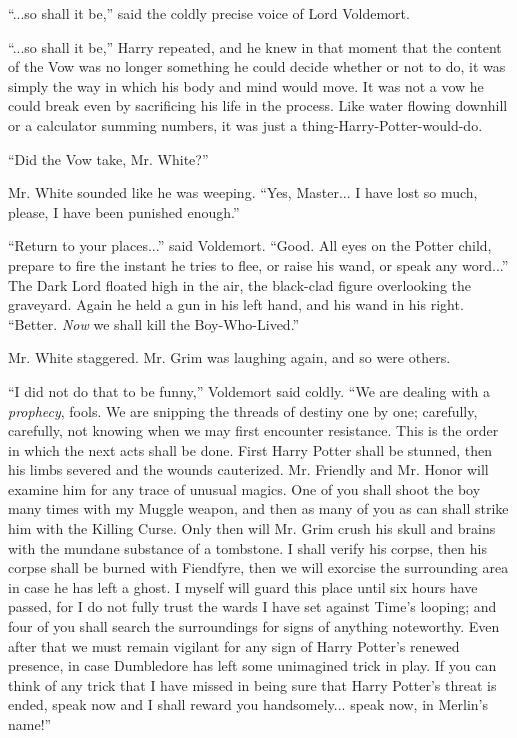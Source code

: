 ``...so shall it be,'' said the coldly precise voice of Lord Voldemort.

``...so shall it be,'' Harry repeated, and he knew in that moment that the content of the Vow was no longer something he could decide whether or not to do, it was simply the way in which his body and mind would move. It was not a vow he could break even by sacrificing his life in the process. Like water flowing downhill or a calculator summing numbers, it was just a thing-Harry-Potter-would-do.

``Did the Vow take, Mr. White?''

Mr. White sounded like he was weeping. ``Yes, Master... I have lost so much, please, I have been punished enough.''

``Return to your places...'' said Voldemort. ``Good. All eyes on the Potter child, prepare to fire the instant he tries to flee, or raise his wand, or speak any word...'' The Dark Lord floated high in the air, the black-clad figure overlooking the graveyard. Again he held a gun in his left hand, and his wand in his right. ``Better. \emph{Now} we shall kill the Boy-Who-Lived.''

Mr. White staggered. Mr. Grim was laughing again, and so were others.

``I did not do that to be funny,'' Voldemort said coldly. ``We are dealing with a \emph{prophecy}, fools. We are snipping the threads of destiny one by one; carefully, carefully, not knowing when we may first encounter resistance. This is the order in which the next acts shall be done. First Harry Potter shall be stunned, then his limbs severed and the wounds cauterized. Mr. Friendly and Mr. Honor will examine him for any trace of unusual magics. One of you shall shoot the boy many times with my Muggle weapon, and then as many of you as can shall strike him with the Killing Curse. Only then will Mr. Grim crush his skull and brains with the mundane substance of a tombstone. I shall verify his corpse, then his corpse shall be burned with Fiendfyre, then we will exorcise the surrounding area in case he has left a ghost. I myself will guard this place until six hours have passed, for I do not fully trust the wards I have set against Time's looping; and four of you shall search the surroundings for signs of anything noteworthy. Even after that we must remain vigilant for any sign of Harry Potter's renewed presence, in case Dumbledore has left some unimagined trick in play. If you can think of any trick that I have missed in being sure that Harry Potter's threat is ended, speak now and I shall reward you handsomely... speak now, in Merlin's name!''

